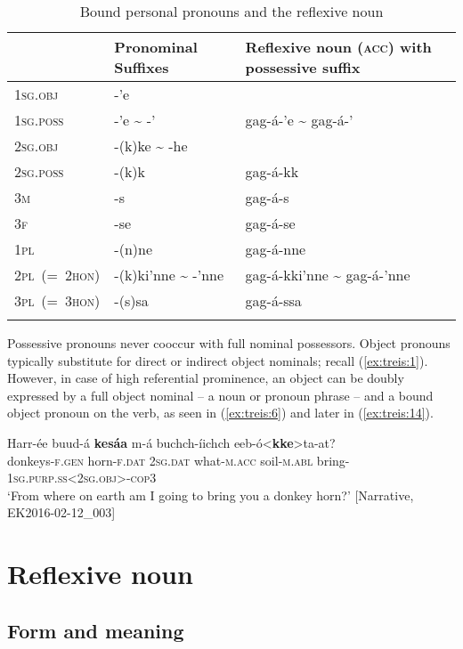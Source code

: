 \documentclass[output=paper]{langscibook}
\begin{document}
\begin{table}
\caption{Bound personal pronouns and the reflexive noun}
\label{tab:treis:2}
\begin{tabularx}{0.9\textwidth}{lp{4.5cm}p{4.5cm}} 
\lsptoprule 
& {Pronominal Suffixes} & {Reflexive noun (\textsc{acc}) with possessive suffix}\\
\midrule 
\textsc{1sg.obj} & {-’e} & \\
\textsc{1sg.poss}& {-’e {\textasciitilde} -’} & {gag-á-’e} {{\textasciitilde} gag-á-’}\\
\textsc{2sg.obj} & {-(k)ke {\textasciitilde} -he} & \\
\textsc{2sg.poss}& {-(k)k} & {gag-á-kk}\\
\textsc{3m} & {-s} & {gag-á-s}\\
\textsc{3f} & {-se} & {gag-á-se}\\
\textsc{1pl} & {-(n)ne} & {gag-á-nne}\\
\textsc{2pl~(=~2hon)} & {-(k)ki’nne {\textasciitilde} -’nne} & {gag-á-kki’nne} {{\textasciitilde} gag-á-’nne}\\
\textsc{3pl~(=~3hon)} & {-(s)sa} & {gag-á-ssa}\\
\lspbottomrule
\end{tabularx}
\end{table}

Possessive pronouns never cooccur with full nominal possessors. Object pronouns typically substitute for direct or indirect object nominals; recall (\ref{ex:treis:1}). However, in case of high referential prominence, an object can be doubly expressed by a full object nominal – a noun or pronoun phrase – and a bound object pronoun on the verb, as seen in (\ref{ex:treis:6}) and later in (\ref{ex:treis:14}).

\ea\label{ex:treis:6} 
\gll Harr-ée buud-á \textbf{kesáa} m-á buchch-íichch eeb-ó<\textbf{kke}>ta-at?\\
     donkeys-\textsc{f.gen} horn-\textsc{f.dat} \textsc{2sg.dat} what-\textsc{m.acc} soil-\textsc{m.abl} bring-\textsc{1sg.purp.ss<2sg.obj>-cop3}\\
\glt ‘From where on earth am I going to bring you a donkey horn?’ [Narrative, EK2016-02-12\_003]\z

\section{Reflexive noun}\label{sec:treis:3}
\subsection{Form and meaning}\label{sec:treis:3.1}
\end{document}
